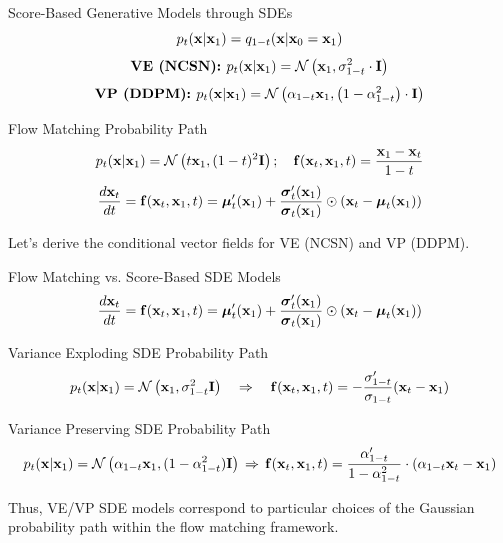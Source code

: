 \documentclass{beamer}
\renewcommand{\eqpause}{}
\begin{document}
\begin{frame}{Score-Based Generative Models through SDEs}
	\[
		p_t(\mathbf{x}| \mathbf{x}_1) = q_{1-t}(\mathbf{x}| \mathbf{x}_0=\mathbf{x}_1)
	\]
	\[
		\textbf{VE (NCSN): } p_t(\mathbf{x} | \mathbf{x}_1) = \mathcal{N}\left(\mathbf{x}_1, \sigma^2_{1-t} \cdot \mathbf{I}\right)
	\]
	\vspace{-0.5cm}
	\[
		\textbf{VP (DDPM): } p_t(\mathbf{x} | \mathbf{x}_1) = \mathcal{N}\left(\alpha_{1-t} \mathbf{x}_1, \left(1 - \alpha_{1-t}^2\right) \cdot \mathbf{I}\right)
	\]
	\vspace{-0.5cm}
	\eqpause
	\begin{block}{Flow Matching Probability Path}
		\vspace{-0.3cm}
		\[
			p_t(\mathbf{x} | \mathbf{x}_1) = \mathcal{N}\left(t \mathbf{x}_1, (1-t)^2 \mathbf{I}\right); \quad \mathbf{f}(\mathbf{x}_t, \mathbf{x}_1, t) = \frac{\mathbf{x}_1  - \mathbf{x}_t}{1-t}
		\]
		\vspace{-0.3cm}
		\[
	 		\frac{d\mathbf{x}_t}{dt} = \mathbf{f}(\mathbf{x}_t, \mathbf{x}_1, t) =  \boldsymbol{\mu}_t'(\mathbf{x}_1) + \frac{\boldsymbol{\sigma}_t'(\mathbf{x}_1)}{\boldsymbol{\sigma}_t(\mathbf{x}_1)} \odot (\mathbf{x}_t - \boldsymbol{\mu}_t(\mathbf{x}_1))
		\]
	\end{block}
	\eqpause
	Let's derive the conditional vector fields for VE (NCSN) and VP (DDPM).
\end{frame}
\begin{frame}{Flow Matching vs. Score-Based SDE Models}
	\[
		\frac{d\mathbf{x}_t}{dt} = \mathbf{f}(\mathbf{x}_t, \mathbf{x}_1, t) =  \boldsymbol{\mu}_t'(\mathbf{x}_1) + \frac{\boldsymbol{\sigma}_t'(\mathbf{x}_1)}{\boldsymbol{\sigma}_t(\mathbf{x}_1)} \odot (\mathbf{x}_t - \boldsymbol{\mu}_t(\mathbf{x}_1))
	\]
	\eqpause
	\begin{block}{Variance Exploding SDE Probability Path}
		\vspace{-0.5cm}
		\[
				p_t(\mathbf{x} | \mathbf{x}_1) = \mathcal{N}\left(\mathbf{x}_1, \sigma^2_{1-t}  \mathbf{I}\right) \quad \Rightarrow \quad 
				\mathbf{f}(\mathbf{x}_t, \mathbf{x}_1, t) = - \frac{\sigma'_{1-t}}{\sigma_{1-t}} (\mathbf{x}_t - \mathbf{x}_1)
		\]
		\vspace{-0.3cm}
	\end{block}
	\eqpause
	\begin{block}{Variance Preserving SDE Probability Path}
		\vspace{-0.5cm}
		{\small
		\[
			p_t(\mathbf{x} | \mathbf{x}_1) = \mathcal{N}\left(\alpha_{1-t}  \mathbf{x}_1, (1 - \alpha^2_{1-t})  \mathbf{I} \right)  \, \Rightarrow \, 
		\mathbf{f}(\mathbf{x}_t, \mathbf{x}_1, t) = \frac{\alpha'_{1-t}}{1 - \alpha^2_{1-t}}\cdot \left(\alpha_{1-t}  \mathbf{x}_t - \mathbf{x}_1\right)
		\]
		}
	\end{block}
	Thus, VE/VP SDE models correspond to particular choices of the Gaussian probability path within the flow matching framework.
\end{frame}
\end{document}
